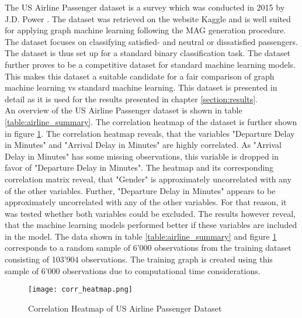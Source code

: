   The US Airline Passenger dataset is a survey which was conducted in 2015
  by J.D. Power \citeyearpar{JDPower2015}. The dataset was retrieved on the 
  website Kaggle \citeyearpar{KAGGLE2015} and is well suited for 
  applying graph machine learning following the MAG generation procedure. 
  The dataset focuses on classifying satisfied- and neutral or 
  dissatisfied passengers. The dataset is thus set up for a standard binary 
  classification task. The dataset further proves to be a competitive dataset 
  for standard machine learning models. This makes this dataset a suitable 
  candidate for a fair comparison of graph machine learning vs standard machine 
  learning. This dataset is presented in detail as it is used for the results 
  presented in chapter \ref{section:results}. \\

  \noindent An overview of the US Airline Passenger dataset is shown in table
  \ref{table:airline_summary}. The correlation heatmap of the dataset is
  further shown in figure \ref{fig:corr_heatmap}. The correlation heatmap
  reveals, that the variables "Departure Delay in Minutes" and "Arrival Delay
  in Minutes" are highly correlated. As "Arrival Delay in Minutes" has some
  missing observations, this variable is dropped in favor of "Departure Delay 
  in Minutes". The heatmap and its corresponding correlation matrix reveal,
  that "Gender" is approximately uncorrelated with any of the other variables.
  Further, "Departure Delay in Minutes" appears to be approximately 
  uncorrelated with any of the other variables. For that reason, it was tested
  whether both variables could be excluded. The results however reveal, that
  the machine learning models performed better if these variables are included 
  in the model. The data shown in table \ref{table:airline_summary} and 
  figure \ref{fig:corr_heatmap} corresponds to a random sample of 6’000 
  observations from the training dataset consisting of 103’904 observations.
  The training graph is created using this sample of 6'000 observations due
  to computational time considerations. 

  \begin{figure}[h]
	  \centering
	  \texttt{[image: corr\_heatmap.png]}
	  \caption{Correlation Heatmap of US Airline Passenger Dataset}
      \label{fig:corr_heatmap}
  \end{figure}

